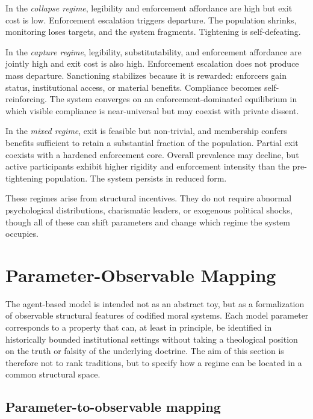 \documentclass[12pt]{article}
\begin{document}
In the \textit{collapse regime}, legibility and enforcement affordance are high but exit cost is low. Enforcement escalation triggers departure. The population shrinks, monitoring loses targets, and the system fragments. Tightening is self-defeating.

In the \textit{capture regime}, legibility, substitutability, and enforcement affordance are jointly high and exit cost is also high. Enforcement escalation does not produce mass departure. Sanctioning stabilizes because it is rewarded: enforcers gain status, institutional access, or material benefits. Compliance becomes self-reinforcing. The system converges on an enforcement-dominated equilibrium in which visible compliance is near-universal but may coexist with private dissent.

In the \textit{mixed regime}, exit is feasible but non-trivial, and membership confers benefits sufficient to retain a substantial fraction of the population. Partial exit coexists with a hardened enforcement core. Overall prevalence may decline, but active participants exhibit higher rigidity and enforcement intensity than the pre-tightening population. The system persists in reduced form.

These regimes arise from structural incentives. They do not require abnormal psychological distributions, charismatic leaders, or exogenous political shocks, though all of these can shift parameters and change which regime the system occupies.



\section{Parameter-Observable Mapping}

The agent-based model is intended not as an abstract toy, but as a formalization of observable structural features of codified moral systems. Each model parameter corresponds to a property that can, at least in principle, be identified in historically bounded institutional settings without taking a theological position on the truth or falsity of the underlying doctrine. The aim of this section is therefore not to rank traditions, but to specify how a regime can be located in a common structural space.

\subsection{Parameter-to-observable mapping}
\end{document}
